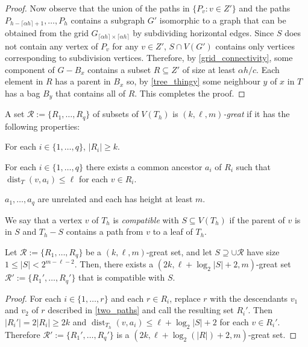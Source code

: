 \documentclass{patmorin}
\newcommand{\defin}[1]{\emph{\color{brightmaroon}#1}}
\DeclareMathOperator{\dist}{dist}
\renewcommand{\le}{\leqslant}
\renewcommand{\ge}{\geqslant}
\begin{document}
\begin{proof}
  Now observe that the union of the paths in  $\{P_{v}:v\in Z'\}$ and the paths $P_{h-\lceil\alpha h\rceil+1},\ldots,P_{h}$ contains a subgraph $G'$ isomorphic to a graph that can be obtained from the grid $G_{\lceil \alpha h\rceil\times\lceil \alpha h\rceil}$ by subdividing horizontal edges.  Since $S$ does not contain any vertex of $P_{v}$ for any $v\in Z'$,  $S\cap V(G')$ contains only vertices corresponding to subdivision vertices.  Therefore, by \cref{grid_connectivity}, some component of $G-B_x$ contains a subset $R\subseteq Z'$ of size at least $\alpha h/c$.  Each element in $R$ has a parent in $B_x$ so, by \cref{tree_thingy} some neighbour $y$ of $x$ in $T$ has a bag $B_y$ that contains all of $R$.  This completes the proof.
\end{proof}


A set $\mathcal{R}:=\{R_1,\ldots,R_q\}$ of subsets of $V(T_h)$ is \defin{$(k,\ell,m)$-great} if it has the following properties:

\begin{compactenum}
  \item For each $i\in\{1,\ldots,q\}$, $|R_i|\ge k$.
  \item For each $i\in\{1,\ldots,q\}$ there exists a common ancestor $a_i$ of $R_i$ such that $\dist_T(v,a_i)\le\ell$ for each $v\in R_i$.
  \item $a_1,\ldots,a_q$ are unrelated and each has height at least $m$.
\end{compactenum}

We say that a vertex $v$ of $T_h$ is \defin{compatible} with $S\subseteq V(T_h)$ if the parent of $v$ is in $S$ and $T_h-S$ contains a path from $v$ to a leaf of $T_h$.


\begin{lem}\label{compatible_set}
  Let $\mathcal{R}:=\{R_1,\ldots,R_q\}$ be a $(k,\ell,m)$-great set,  and let $S\supseteq \cup\mathcal{R}$ have size $1\le |S|< 2^{m-\ell-2}$.  Then, there exists a $(2k,\ell + \log_2|S|+2,m)$-great set $\mathcal{R}':=\{R_1',\ldots,R_q'\}$ that is compatible with $S$.
\end{lem}

\begin{proof}
  For each $i\in\{1,\ldots,r\}$ and each $r\in R_i$, replace $r$ with the descendants $v_1$ and $v_2$ of $r$ described in \cref{two_paths} and call the resulting set $R_i'$.   Then $|R_i'|=2|R_i|\ge 2k$ and $\dist_{T_h}(v,a_i)\le \ell+\log_2|S|+2$ for each $v\in R_i'$.  Therefore $\mathcal{R}':=\{R_1',\ldots,R_q'\}$ is a $(2k,\ell + \log_2(|R|)+2,m)$-great set.
\end{proof}
\end{document}
